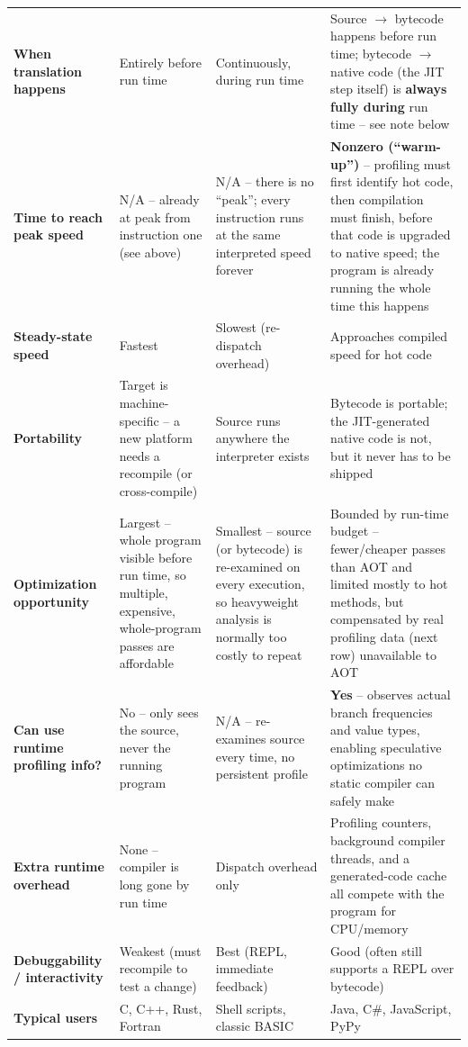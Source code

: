 \documentclass[full-course-notes.tex]{subfiles}
\begin{document}
\begin{longtable}{@{} p{} p{} p{} p{} @{}}
\textbf{When translation happens} & Entirely before run time & Continuously, during run time & Source $\to$ bytecode happens before run time; bytecode $\to$ native code (the JIT step itself) is \textbf{always fully during} run time -- see note below \\
\textbf{Time to reach peak speed} & N/A -- already at peak from instruction one (see above) & N/A -- there is no ``peak''; every instruction runs at the same interpreted speed forever & \textbf{Nonzero (``warm-up'')} -- profiling must first identify hot code, then compilation must finish, before that code is upgraded to native speed; the program is already running the whole time this happens \\
\textbf{Steady-state speed} & Fastest & Slowest (re-dispatch overhead) & Approaches compiled speed for hot code \\
\textbf{Portability} & Target is machine-specific -- a new platform needs a recompile (or cross-compile) & Source runs anywhere the interpreter exists & Bytecode is portable; the JIT-generated native code is not, but it never has to be shipped \\
\textbf{Optimization opportunity} & Largest -- whole program visible before run time, so multiple, expensive, whole-program passes are affordable & Smallest -- source (or bytecode) is re-examined on every execution, so heavyweight analysis is normally too costly to repeat & Bounded by run-time budget -- fewer/cheaper passes than AOT and limited mostly to hot methods, but compensated by real profiling data (next row) unavailable to AOT \\
\textbf{Can use runtime profiling info?} & No -- only sees the source, never the running program & N/A -- re-examines source every time, no persistent profile & \textbf{Yes} -- observes actual branch frequencies and value types, enabling speculative optimizations no static compiler can safely make \\
\textbf{Extra runtime overhead} & None -- compiler is long gone by run time & Dispatch overhead only & Profiling counters, background compiler threads, and a generated-code cache all compete with the program for CPU/memory \\
\textbf{Debuggability / interactivity} & Weakest (must recompile to test a change) & Best (REPL, immediate feedback) & Good (often still supports a REPL over bytecode) \\
\textbf{Typical users} & C, C++, Rust, Fortran & Shell scripts, classic BASIC & Java, C\#, JavaScript, PyPy \\
\end{longtable}
\normalsize
\end{document}
